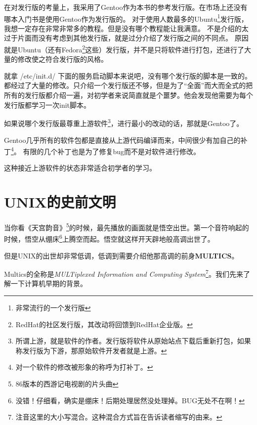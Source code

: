 在对发行版的考量上，我采用了Gentoo作为本书的参考发行版。在市场上还没有哪本入门书是使用Gentoo作为发行版的。
对于使用人数最多的Ubuntu\footnote{非常流行的一个发行版}发行版，我想一定存在非常非常多的教程。但是没有哪个教程能让我满意。
不是介绍的太过于片面而没有考虑到其他发行版，就是过分介绍了发行版之间的不同点。
原因就是Ubuntu（还有Fedora\footnote{RedHat的社区发行版，其改动将回馈到RedHat企业版。}这些）发行版，并不是只将软件进行打包，还进行了大量的修改使之符合发行版的风格。

\begin{notice}
就拿 /etc/init.d/ 下面的服务启动脚本来说吧，没有哪个发行版的脚本是一致的。
都经过了大量的修改。只介绍一个发行版还不够，但是为了“全面”而大而全式的把所有的发行版都介绍一遍，对初学者来说简直就是个噩梦。他会发现他需要为每个发行版都学习一次init脚本。
\end{notice}

如果说哪个发行版最尊重上游软件\footnote{所谓上游，就是软件的作者。发行版将软件从原始站点下载后重新打包，如果称发行版为下游，那原始软件开发者就是上游。}，进行最小的改动的话，那就是Gentoo了。

Gentoo几乎所有的软件包都是直接从上游代码编译而来，中间很少有加自己的补丁\footnote{对一个软件的修改被形象的称呼为打补丁。}。
有限的几个补丁也是为了修复bug而不是对软件进行修改。

这种接近上游软件的状态非常适合初学者的学习。

\section{UNIX的史前文明}

当你看《天宫韵音》\footnote{86版本的西游记电视剧的片头曲}的时候，最先播放的画面就是悟空出世。第一个音符响起的时候，悟空从绷床\footnote{没错！仔细看，确实是绷床！后期处理居然没处理掉。BUG无处不在啊！}上腾空而起。悟空就这样开天辟地般高调出世了。

但是UNIX的出世却非常低调，低调到需要介绍他那高调的前身\textbf{MULTICS}。

Multics的全称是\textit{MULTiplexed Information and Computing System}\footnote{注音这里的大小写混合。这种混合方式旨在告诉读者缩写的由来。}。我们先来了解一下计算机早期的背景。



